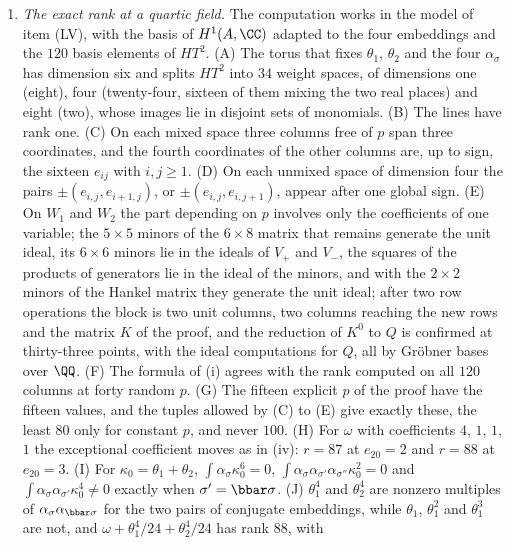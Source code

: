 \begin{enumerate}[label=\textup{(\Roman*)},leftmargin=*]
\item \emph{The exact rank at a quartic field.} The computation works in the
  model of item (LV), with the basis of $H^{1}(A,\CC)$ adapted to the four
  embeddings and the $120$ basis elements of $HT^{2}$. (A) The torus that
  fixes $\theta_{1}$, $\theta_{2}$ and the four $\alpha_{\sigma}$ has
  dimension six and splits $HT^{2}$ into $34$ weight spaces, of dimensions
  one (eight), four (twenty-four, sixteen of them mixing the two real
  places) and eight (two), whose images lie in disjoint sets of monomials.
  (B) The lines have rank one. (C) On each mixed space three columns free
  of $p$ span three coordinates, and the fourth coordinates of the other
  columns are, up to sign, the sixteen $e_{ij}$ with $i,j\ge1$. (D) On each
  unmixed space of dimension four the pairs $\pm(e_{i,j},e_{i+1,j})$, or
  $\pm(e_{i,j},e_{i,j+1})$, appear after one global sign. (E) On $W_{1}$
  and $W_{2}$ the part depending on $p$ involves only the coefficients of
  one variable; the $5\times5$ minors of the $6\times8$ matrix that remains
  generate the unit ideal, its $6\times6$ minors lie in the ideals of
  $V_{+}$ and $V_{-}$, the squares of the products of generators lie in the
  ideal of the minors, and with the $2\times2$ minors of the Hankel matrix
  they generate the unit ideal; after two row operations the block is two
  unit columns, two columns reaching the new rows and the matrix $K$ of the
  proof, and the reduction of $K^{0}$ to $Q$ is confirmed at thirty-three
  points, with the ideal computations for $Q$, all by Gr\"obner bases over
  $\QQ$. (F) The formula of (i) agrees with the rank
  computed on all $120$ columns at forty random $p$. (G) The fifteen
  explicit $p$ of the proof have the fifteen values, and the tuples allowed
  by (C) to (E) give exactly these, the least $80$ only for constant $p$,
  and never $100$. (H) For $\omega$ with coefficients $4$, $1$, $1$, $1$ the exceptional coefficient moves as in
  (iv): $r=87$ at $e_{20}=2$ and $r=88$ at
  $e_{20}=3$. (I) For $\kappa_{0}=\theta_{1}+\theta_{2}$,
  $\int\alpha_{\sigma}\kappa_{0}^{6}=0$, $\int\alpha_{\sigma}\alpha_{\sigma'}
  \alpha_{\sigma''}\kappa_{0}^{2}=0$ and $\int\alpha_{\sigma}
  \alpha_{\sigma'}\kappa_{0}^{4}\ne0$ exactly when $\sigma'=\bbar\sigma$.
  (J) $\theta_{1}^{4}$ and $\theta_{2}^{4}$ are nonzero multiples of
  $\alpha_{\sigma}\alpha_{\bbar\sigma}$ for the two pairs of conjugate
  embeddings, while $\theta_{1}$, $\theta_{1}^{2}$ and $\theta_{1}^{3}$ are
  not, and $\omega+\theta_{1}^{4}/24+\theta_{2}^{4}/24$ has rank $88$, with

\end{enumerate}
